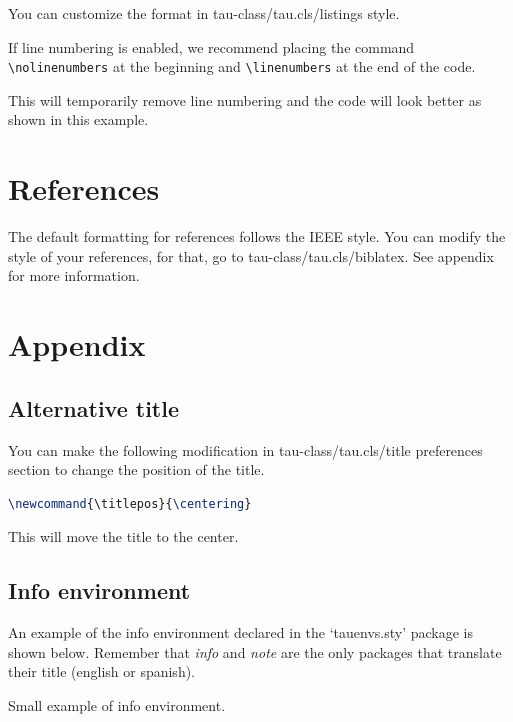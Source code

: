 \documentclass[9pt,a4paper,twoside]{tau-class/tau}
\begin{document}
    You can customize the format in tau-class/tau.cls/listings style.
	
	\nolinenumbers
	
	\linenumbers
	
    If line numbering is enabled, we recommend placing the command \verb|\nolinenumbers| at the beginning and \verb|\linenumbers| at the end of the code. 
	
    This will temporarily remove line numbering and the code will look better as shown in this example.
	
\section{References}

    The default formatting for references follows the IEEE style. You can modify the style of your references, for that, go to tau-class/tau.cls/biblatex. See appendix for more information.
	
\section{Appendix}

    \subsection{Alternative title}

        You can make the following modification in tau-class/tau.cls/title preferences section to change the position of the title.

\nolinenumbers
\begin{lstlisting}[language=TeX, caption=Alternative title.]
\newcommand{\titlepos}{\centering}
\end{lstlisting}
\linenumbers

	This will move the title to the center. 

    \subsection{Info environment}

        An example of the info environment declared in the ‘tauenvs.sty’ package is shown below. Remember that \textit{info} and \textit{note} are the only packages that translate their title (english or spanish).
		
	\begin{info}
		Small example of info environment.
	\end{info}
\end{document}
